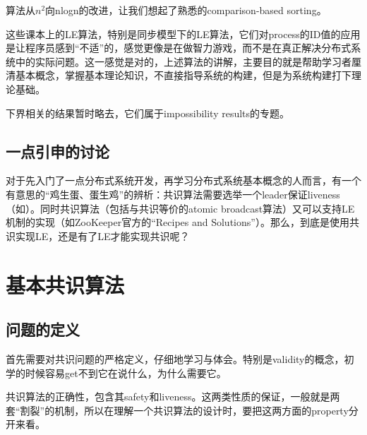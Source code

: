 \documentclass[UTF8]{ctexrep}
\begin{document}
算法从$n^2$向nlogn的改进，让我们想起了熟悉的comparison-based sorting。

这些课本上的LE算法，特别是同步模型下的LE算法，它们对process的ID值的应用是让程序员感到“不适”的，感觉更像是在做智力游戏，而不是在真正解决分布式系统中的实际问题。这一感觉是对的，上述算法的讲解，主要目的就是帮助学习者厘清基本概念，掌握基本理论知识，不直接指导系统的构建，但是为系统构建打下理论基础。

下界相关的结果暂时略去，它们属于impossibility results的专题。


\section{一点引申的讨论}

对于先入门了一点分布式系统开发，再学习分布式系统基本概念的人而言，有一个有意思的“鸡生蛋、蛋生鸡”的辨析：共识算法需要选举一个leader保证liveness（如\cite{Lamport01}）。同时共识算法（包括与共识等价的atomic broadcast算法）又可以支持LE机制的实现（如ZooKeeper官方的“Recipes and Solutions”）。那么，到底是使用共识实现LE，还是有了LE才能实现共识呢？


\chapter{基本共识算法}

\section{问题的定义}

首先需要对共识问题的严格定义，仔细地学习与体会。特别是validity的概念，初学的时候容易get不到它在说什么，为什么需要它。


共识算法的正确性，包含其safety和liveness。这两类性质的保证，一般就是两套“割裂”的机制，所以在理解一个共识算法的设计时，要把这两方面的property分开来看。

\end{document}
